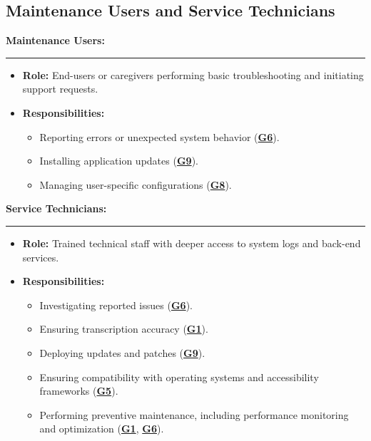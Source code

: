 \documentclass[12pt]{article}
\begin{document}
\subsection{Maintenance Users and Service Technicians}
\textbf{Maintenance Users:}\\
\hrule
\begin{itemize}
    \item \textbf{Role:} End-users or caregivers performing basic troubleshooting and initiating support requests.
    \item \textbf{Responsibilities:} 
        \begin{itemize}
            \item Reporting errors or unexpected system behavior (\textbf{\hyperref[tab:project-goals]{G6}}).
            \item Installing application updates (\textbf{\hyperref[tab:project-goals]{G9}}).
            \item Managing user-specific configurations (\textbf{\hyperref[tab:project-goals]{G8}}).
        \end{itemize}
\end{itemize}
\vspace{1em}
\textbf{Service Technicians:}\\
\hrule
\begin{itemize}
    \item \textbf{Role:} Trained technical staff with deeper access to system logs and back-end services.
    \item \textbf{Responsibilities:}
        \begin{itemize}
            \item Investigating reported issues (\textbf{\hyperref[tab:project-goals]{G6}}).
            \item Ensuring transcription accuracy (\textbf{\hyperref[tab:project-goals]{G1}}).
            \item Deploying updates and patches (\textbf{\hyperref[tab:project-goals]{G9}}).
            \item Ensuring compatibility with operating systems and accessibility frameworks (\textbf{\hyperref[tab:project-goals]{G5}}).
            \item Performing preventive maintenance, including performance monitoring and optimization (\textbf{\hyperref[tab:project-goals]{G1}}, \textbf{\hyperref[tab:project-goals]{G6}}).
        \end{itemize}
\end{itemize}
\end{document}
